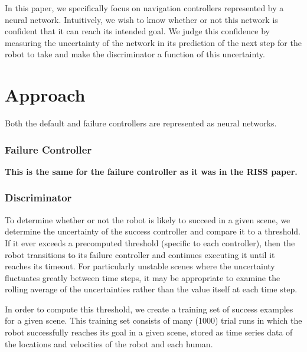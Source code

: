 \documentclass[letterpaper]{article}
\begin{document}
				In this paper, we specifically focus on navigation controllers represented by a neural network. Intuitively, we wish to know whether or not this network is confident that it can reach its intended goal. We judge this confidence by measuring the uncertainty of the network in its prediction of the next step for the robot to take and make the discriminator a function of this uncertainty. 
	\section{Approach}
			Both the default and failure controllers are represented as neural networks. 
			
			\subsubsection{Failure Controller}
				\textbf{This is the same for the failure controller as it was in the RISS paper.}
			
			\subsubsection{Discriminator}
				To determine whether or not the robot is likely to succeed in a given scene, we determine the uncertainty of the success controller and compare it to a threshold. If it ever exceeds a precomputed threshold (specific to each controller), then the robot transitions to its failure controller and continues executing it until it reaches its timeout. For particularly unstable scenes where the uncertainty fluctuates greatly between time steps, it may be appropriate to examine the rolling average of the uncertainties rather than the value itself at each time step. 
				
				In order to compute this threshold, we create a training set of success examples for a given scene. This training set consists of many (1000) trial runs in which the robot successfully reaches its goal in a given scene, stored as time series data of the locations and velocities of the robot and each human. 
				
\end{document}
